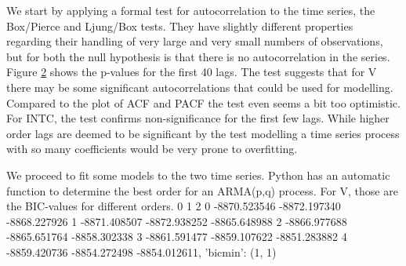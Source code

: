 We start by applying a formal test for autocorrelation to the time series, the Box/Pierce and Ljung/Box tests. They have slightly different properties regarding their handling of very large and very small numbers of observations, but for both the null hypothesis is that there is no autocorrelation in the series. Figure \ref{fig:ljungbox} shows the p-values for the first 40 lags. The test suggests that for V there may be some significant autocorrelations that could be used for modelling. Compared to the plot of ACF and PACF the test even seems a bit too optimistic. For INTC, the test confirms non-significance for the first few lags. While higher order lags are deemed to be significant by the test modelling a time series process with so many coefficients would be very prone to overfitting. 

\begin{figure}[h]
    \centering
    \begin{adjustbox}{width=.95\textwidth,center}
    
    \end{adjustbox}
    
    \begin{adjustbox}{width=.95\textwidth,center}
    
    \end{adjustbox} 
    
    \caption{}
    \label{fig:INTC_V_ACF_log_returns}
\end{figure}{}


\begin{figure}[h]
    \centering
    \begin{adjustbox}{width=.95\textwidth,center}
    
    
    \end{adjustbox}
    \caption{}
    \label{fig:ljungbox}
\end{figure}{}

We proceed to fit some models to the two time series. Python has an automatic function to determine the best order for an ARMA(p,q) process. For V, those are the BIC-values for different orders. 
         0            1            2
 0 -8870.523546 -8872.197340 -8868.227926
 1 -8871.408507 -8872.938252 -8865.648988
 2 -8866.977688 -8865.651764 -8858.302338
 3 -8861.591477 -8859.107622 -8851.283882
 4 -8859.420736 -8854.272498 -8854.012611, 'bicmin': (1, 1)

